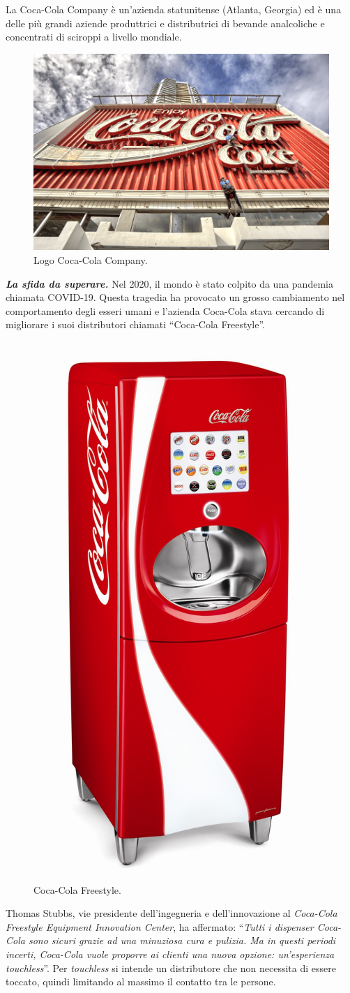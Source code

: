 \documentclass[a4paper]{article}
\newcommand{\dquotes}[1]{``#1''}
\begin{document}
	\noindent
	La Coca-Cola Company è un'azienda statunitense (Atlanta, Georgia) ed è una delle più grandi aziende produttrici e distributrici di bevande analcoliche e concentrati di sciroppi a livello mondiale.
	\begin{figure}[!htp]
		\centering
		\includegraphics[width=.58\textwidth]{img/Coca-Cola-1.png}
		\caption{Logo Coca-Cola Company.}
	\end{figure}\newpage
	
	\noindent
	\textbf{\emph{La sfida da superare.}} Nel 2020, il mondo è stato colpito da una pandemia chiamata COVID-19. Questa tragedia ha provocato un grosso cambiamento nel comportamento degli esseri umani e l'azienda Coca-Cola stava cercando di migliorare i suoi distributori chiamati \dquotes{Coca-Cola Freestyle}.
	\begin{figure}[!htp]
		\centering
		\includegraphics[width=.3\textwidth]{img/Coca-Cola-2.jpg}
		\caption{Coca-Cola Freestyle.}
	\end{figure}
	
	\noindent
	Thomas Stubbs, vie presidente dell'ingegneria e dell'innovazione al \emph{Coca-Cola Freestyle Equipment Innovation Center}, ha affermato: \dquotes{\emph{Tutti i dispenser Coca-Cola sono sicuri grazie ad una minuziosa cura e pulizia. Ma in questi periodi incerti, Coca-Cola vuole proporre ai clienti una nuova opzione: un'esperienza touchless}}. Per \emph{touchless} si intende un distributore che non necessita di essere toccato, quindi limitando al massimo il contatto tra le persone.\newline
	
\end{document}
